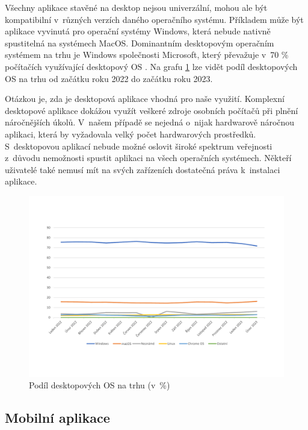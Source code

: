 Všechny aplikace stavěné na desktop nejsou univerzální, mohou ale být kompatibilní v~různých verzích daného operačního systému. Příkladem může být aplikace vyvinutá pro operační systémy Windows, která nebude nativně spustitelná na systémech MacOS. Dominantním desktopovým operačním systémem na trhu je Windows společnosti Microsoft, který převažuje v~70 \% počítačích využívající desktopový OS \cite{marketshare-desktop-os}. Na grafu \ref{fig:MarketshareDesktopOS} lze vidět podíl desktopových OS na trhu od začátku roku 2022 do začátku roku 2023.

Otázkou je, zda je desktopová aplikace vhodná pro naše využití. Komplexní desktopové aplikace dokážou využít veškeré zdroje osobních počítačů při plnění náročnějších úkolů. V~našem případě se nejedná o~nijak hardwarově náročnou aplikaci, která by vyžadovala velký počet hardwarových prostředků. S~desktopovou aplikací nebude možné oslovit široké spektrum veřejnosti z~důvodu nemožnosti spustit aplikaci na všech operačních systémech. Někteří uživatelé také nemusí mít na svých zařízeních dostatečná práva k~instalaci aplikace.

\begin{figure}
	\centering
	\includegraphics[width=1\textwidth]{Pictures/graf1.pdf}
	\caption{Podíl desktopových OS na trhu (v~\%) \cite{marketshare-desktop-os}}
	\label{fig:MarketshareDesktopOS}
\end{figure}

\subsection{Mobilní aplikace}

